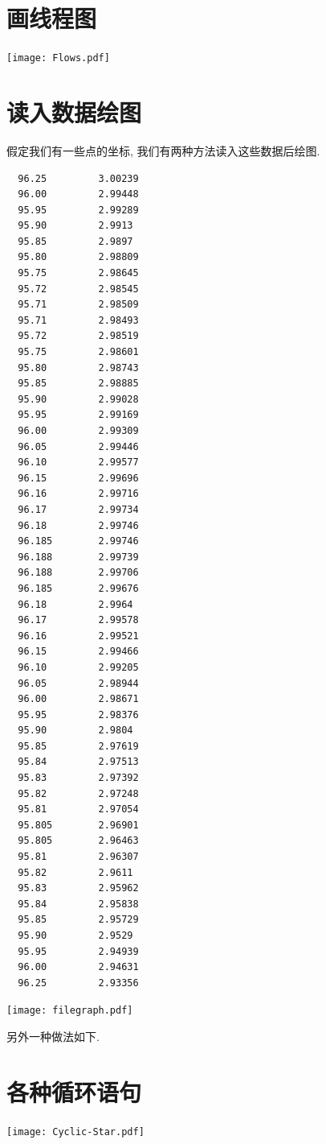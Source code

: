 \documentclass[nofonts,CJKnormalspaces]{ctexbook}
\begin{document}
\section{画线程图}
\begin{center}\texttt{[image: Flows.pdf]}\end{center}%


\section{读入数据绘图}
假定我们有一些点的坐标, 我们有两种方法读入这些数据后绘图.

\begin{lstlisting}
  96.25         3.00239
  96.00         2.99448
  95.95         2.99289
  95.90         2.9913
  95.85         2.9897
  95.80         2.98809
  95.75         2.98645
  95.72         2.98545
  95.71         2.98509
  95.71         2.98493
  95.72         2.98519
  95.75         2.98601
  95.80         2.98743
  95.85         2.98885
  95.90         2.99028
  95.95         2.99169
  96.00         2.99309
  96.05         2.99446
  96.10         2.99577
  96.15         2.99696
  96.16         2.99716
  96.17         2.99734
  96.18         2.99746
  96.185        2.99746
  96.188        2.99739
  96.188        2.99706
  96.185        2.99676
  96.18         2.9964
  96.17         2.99578
  96.16         2.99521
  96.15         2.99466
  96.10         2.99205
  96.05         2.98944
  96.00         2.98671
  95.95         2.98376
  95.90         2.9804
  95.85         2.97619
  95.84         2.97513
  95.83         2.97392
  95.82         2.97248
  95.81         2.97054
  95.805        2.96901
  95.805        2.96463
  95.81         2.96307
  95.82         2.9611
  95.83         2.95962
  95.84         2.95838
  95.85         2.95729
  95.90         2.9529
  95.95         2.94939
  96.00         2.94631
  96.25         2.93356
\end{lstlisting}
\begin{center}\texttt{[image: filegraph.pdf]}\end{center}%


另外一种做法如下.


\section{各种循环语句}
\begin{center}\texttt{[image: Cyclic-Star.pdf]}\end{center}%

\end{document}
